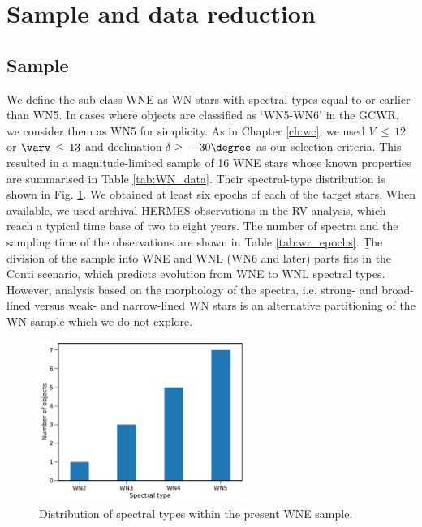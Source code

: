 \section{Sample and data reduction} \label{sect:sample_WNE}
\subsection{Sample}

We define the sub-class WNE as WN stars with spectral types equal to or earlier than WN5. In cases where objects are classified as `WN5-WN6' in the GCWR, we consider them as WN5 for simplicity. As in Chapter \ref{ch:wc}, we used $V\,\leq\,12$ or $\varv\,\leq\,13$ and declination $\delta \ge$ $-30\degree$ as our selection criteria. This resulted in a magnitude-limited sample of 16 WNE stars whose known properties are summarised in Table \ref{tab:WN_data}. Their spectral-type distribution is shown in Fig. \ref{fig:target_dist_WNE}. We obtained at least six epochs of each of the target stars. When available, we used archival HERMES observations in the RV analysis, which reach a typical time base of two to eight years. The number of spectra and the sampling time of the observations are shown in Table \ref{tab:wr_epochs}. \b{The division of the sample into WNE and WNL (WN6 and later) parts fits in the Conti scenario, which predicts evolution from WNE to WNL spectral types. However, analysis based on the morphology of the spectra, i.e. strong- and broad-lined versus weak- and narrow-lined WN stars is an alternative partitioning of the WN sample which we do not explore.}

\begin{figure}[!h]
    \centering
    \includegraphics[width=0.6\textwidth]{chapters/WNE/image/target_dist.pdf}
    \caption{Distribution of spectral types within the present WNE sample.}
    \label{fig:target_dist_WNE}
\end{figure}


